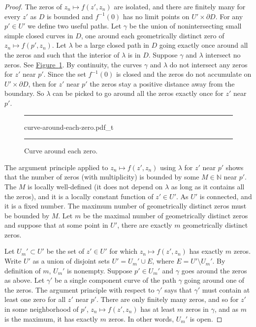 \documentclass[12pt,openany]{book}
\newcommand{\N}{{\mathbb{N}}}
\theoremstyle{plain}
\theoremstyle{remark}
\theoremstyle{definition}
\newenvironment{myfig}{%
\begin{figure}[h!t]
\noindent\rule{\textwidth}{0.5pt}\vspace{12pt}\par\centering}%
{\par\noindent\rule{\textwidth}{0.5pt}
\end{figure}}
\theoremstyle{exercise}
\theoremstyle{example}
\newcommand{\figureref}[1]{\hyperref[#1]{Figure~\ref*{#1}}}
\begin{document}
\begin{proof}
The zeros of $z_n \mapsto f(z',z_n)$ are isolated, and there are finitely
many for every $z'$ as $D$ is bounded and $f^{-1}(0)$ has no limit points on
$U' \times \partial D$.
For any $p' \in U'$ we define two useful paths.
Let $\gamma$ be the union of nonintersecting
small simple closed curves
in $D$, one around each geometrically distinct zero of $z_n \mapsto f(p',z_n)$.
Let $\lambda$ be a large closed path in $D$ going 
exactly once around all the zeros and such that the interior of $\lambda$ is
in $D$.  Suppose $\gamma$ and $\lambda$
intersect no zeros.
See \figureref{fig:curve-around-each-zero}.
By continuity,
the curves $\gamma$
and $\lambda$ do not intersect any zeros for $z'$ near $p'$.
Since the set $f^{-1}(0)$ is closed and the zeros
do not
accumulate on $U' \times \partial D$,
then
for $z'$ near $p'$ the zeros stay a positive distance away from
the boundary.  So $\lambda$ can be picked to go 
around all
the zeros exactly once for $z'$ near $p'$.

\begin{myfig}
{curve-around-each-zero.pdf_t}
\caption{Curve around each zero.\label{fig:curve-around-each-zero}}
\end{myfig}

The argument principle applied to $z_n \mapsto f(z',z_n)$ using $\lambda$ for $z'$ near
$p'$ shows that the number of zeros (with multiplicity) is bounded by some $M \in \N$
near $p'$.  The $M$ is locally well-defined (it does not depend on $\lambda$ as
long as it contains all the zeros), and it is a locally constant function of
$z' \in U'$.
As $U'$ is connected, and it is a fixed number.  The maximum number of
geometrically distinct zeros must be bounded by $M$.  Let $m$ be the maximal
number of geometrically distinct zeros and suppose that at some point
in $U'$, there are exactly $m$ geometrically distinct zeros.

Let $U_m' \subset U'$ be the set of $z' \in U'$ for which $z_n \mapsto f(z',z_n)$
has exactly $m$ zeros.
Write $U'$ as a union of disjoint sets $U' = U_m' \cup E$, where $E = U'
\setminus U_m'$.
By definition of $m$, $U_m'$ is nonempty.  Suppose $p' \in U_m'$ and $\gamma$
goes around the zeros as above.  Let $\gamma'$ be a single component curve
of the path $\gamma$ going around one of the zeros.
The argument principle with respect to $\gamma'$ says that
$\gamma'$ must contain at least one zero for all $z'$ near $p'$.
There are only finitely many zeros, and so for $z'$ in 
some neighborhood of $p'$,
$z_n \mapsto f(z',z_n)$ has at least $m$
zeros in $\gamma$, and as $m$ is the maximum, it has exactly $m$ zeros.
In other words, $U_m'$ is open.


\end{proof}
\end{document}
